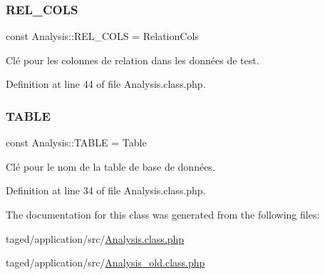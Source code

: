 \mbox{\label{class_analysis_a8443e3fb309ae8e8442b162d5161eb2c}} 
\subsubsection{\texorpdfstring{R\+E\+L\+\_\+\+C\+O\+LS}{REL\_COLS}}
{\footnotesize\ttfamily const Analysis\+::\+R\+E\+L\+\_\+\+C\+O\+LS = \textquotesingle{}Relation\+Cols\textquotesingle{}}

Clé pour les colonnes de relation dans les données de test. 

Definition at line 44 of file Analysis.\+class.\+php.

\mbox{\label{class_analysis_af2ef672d68e1361b2fc14dfd5ce0d63f}} 
\subsubsection{\texorpdfstring{T\+A\+B\+LE}{TABLE}}
{\footnotesize\ttfamily const Analysis\+::\+T\+A\+B\+LE = \textquotesingle{}Table\textquotesingle{}}

Clé pour le nom de la table de base de données. 

Definition at line 34 of file Analysis.\+class.\+php.



The documentation for this class was generated from the following files\+:\begin{DoxyCompactItemize}
\item 
taged/application/src/\hyperlink{_analysis_8class_8php}{Analysis.\+class.\+php}\item 
taged/application/src/\hyperlink{_analysis__old_8class_8php}{Analysis\+\_\+old.\+class.\+php}\end{DoxyCompactItemize}
